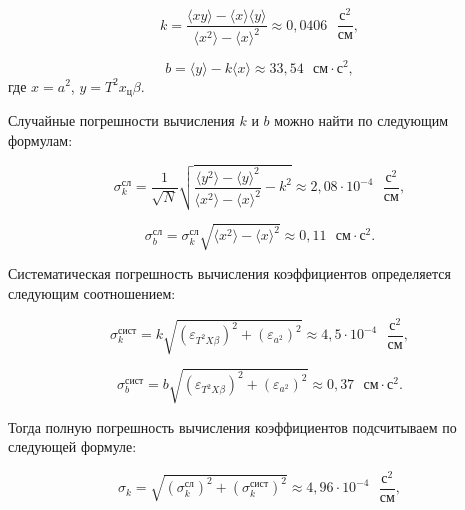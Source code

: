 	\begin{equation}
		k=\frac{\langle xy\rangle-\langle x\rangle \langle y\rangle}{\langle x^2\rangle - \langle x\rangle^2}\approx 0,0406\text{ }\frac{\text{с}^2}{\text{см}},
	\end{equation}
	
	\begin{equation}
		b=\langle y \rangle -k\langle x \rangle\approx 33,54\text{ }\text{см}\cdot\text{с}^2,
	\end{equation}
	где $ x=a^2 $, $ y=T^2x_\text{ц}\beta $.
	
	Случайные погрешности вычисления $ k $ и $ b $ можно найти по следующим формулам:
	
	\begin{equation}
		\sigma_k^\text{сл}=\frac{1}{\sqrt{N}}\sqrt{\frac{\langle y^2 \rangle - \langle y \rangle^2}{\langle x^2 \rangle - \langle x \rangle^2} - k^2  } \approx 2,08\cdot10^{-4} \text{ }\frac{\text{с}^2}{\text{см}},
	\end{equation}
	
	\begin{equation}
		\sigma_b^\text{сл}= \sigma_k^\text{сл} \sqrt{\langle x^2 \rangle - \langle x \rangle^2} \approx 0,11 \text{ }\text{см}\cdot\text{с}^2.
	\end{equation}
	
	Систематическая погрешность вычисления коэффициентов определяется следующим соотношением:
	
	\begin{equation}
		\sigma^\text{сист}_k = k\sqrt{\left( \varepsilon_{T^2X\beta} \right)^2 + \left( \varepsilon_{a^2} \right)^2 } \approx 4,5\cdot10^{-4} \text{ }\frac{\text{с}^2}{\text{см}},
	\end{equation}
	
	\begin{equation}
		\sigma^\text{сист}_b = b\sqrt{\left( \varepsilon_{T^2X\beta} \right)^2 + \left( \varepsilon_{a^2} \right)^2 } \approx  0,37 \text{ }\text{см}\cdot\text{с}^2.
	\end{equation}
	
	Тогда полную погрешность вычисления коэффициентов подсчитываем по следующей формуле:
	
	\begin{equation}
		\sigma_k = \sqrt{\left( \sigma_k^\text{сл} \right)^2 + \left( \sigma_k^\text{сист} \right)^2 } \approx 4,96\cdot 10^{-4} \text{ }\frac{\text{с}^2}{\text{см}},
	\end{equation}
	
